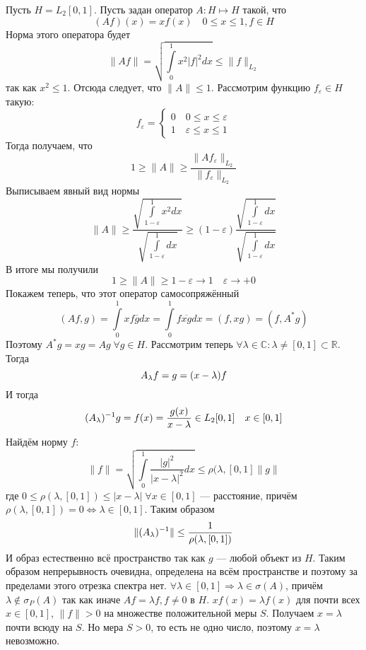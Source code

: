 \documentclass[14pt]{extarticle}
\begin{document}
\nopagebreak
\begin{Prim}
    Пусть $H = L_2[0,1]$.
    Пусть задан оператор $A : H \mapsto H$ такой, что
    $$
    (A f)(x) = x f(x) \quad 0 \le x \le 1, f \in H
    $$
    Норма этого оператора будет
    $$
    \|Af\| = \sqrt{\int\limits_0^1 x^2 |f|^2 dx} \le \|f\|_{L_2}
    $$
    так как $x^2 \le 1$.
    Отсюда следует, что $\|A\| \le 1$.
    Рассмотрим функцию $f_\varepsilon \in H$ такую:
    $$
    f_\varepsilon =
    \left\{
        \begin{aligned}
            0 \quad 0 \le x \le \varepsilon\\
            1 \quad \varepsilon \le x \le 1
        \end{aligned}
    \right.
    $$
    Тогда получаем, что
    $$
    1 \ge \|A\| \ge \dfrac{\|A f_\varepsilon\|_{L_2}}{\|f_\varepsilon\|
    _{L_2}}
    $$
    Выписываем явный вид нормы
    $$
    \|A\| \ge \dfrac{\sqrt{\int\limits_{1 - \varepsilon}^1 x^2 dx}}{\sqrt{\int
    \limits_{1-\varepsilon}^1 dx}} \ge (1  - \varepsilon)
    \dfrac{\sqrt{\int\limits_{1 - \varepsilon}^1 dx}}{\sqrt{\int\limits_{1 - 
    \varepsilon}^1 dx}}
    $$
    В итоге мы получили
    $$
    1 \ge \|A\| \ge 1 - \varepsilon \to 1 \quad \varepsilon \to +0
    $$
    Покажем теперь, что этот оператор самосопряжённый
    $$
    (Af, g) = \int\limits_0^1 x f \overline{g} dx = \int \limits_0^1 f 
    \overline{xg} dx = (f, xg) = (f, A^*g)
    $$
    Поэтому $A^*g = xg =Ag\; \forall g \in H$.
    Рассмотрим теперь $\forall \lambda \in \mathbb C\colon \lambda \ne [0,1] 
    \subset \mathbb R$.
    Тогда
    $$
    \Al f = g = (x - \lambda)f
    $$
    И тогда
    $$
    (A_\lambda)^{-1} g = f(x) = \dfrac{g(x)}{x -\lambda} \in L_2[0,1] \quad x \in [0,1]
    $$
    Найдём норму $f$:
    $$
    \|f\| = \sqrt{\int \limits_0^1 \dfrac{|g|^2}{|x - \lambda|^2}dx} \le 
    \rho(\lambda, [0,1] \|g\|
    $$
    где $0 \le \rho(\lambda, [0, 1]) \le |x - \lambda|\; \forall x \in [0, 1]$ 
    --- расстояние, причём $\rho(\lambda, [0, 1]) = 0 
    \Leftrightarrow \lambda \in [0,1]$.
    Таким образом 
    $$
    \|(A_\lambda)^{-1}\| \le \dfrac{1}{\rho(\lambda, [0, 1])}
    $$
    И образ естественно всё пространство так как $g$ --- любой объект из $H$.
    Таким образом непрерывность очевидна, определена на всём пространстве и 
    поэтому за пределами этого отрезка спектра
    нет.
    $\forall \lambda \in [0,1] \Rightarrow \lambda \in \sigma(A)$, причём $
    \lambda \notin \sigma_P(A)$ так как иначе
    $Af = \lambda f, f \ne 0$ в $H$.
    $x f(x) = \lambda f(x)$ для почти всех $x \in [0,1]$, $\|f\| > 0$ на 
    множестве положительной меры $S$. 
    Получаем $x = \lambda$ почти всюду на $S$.
    Но мера $S > 0$, то есть не одно число, поэтому $x = \lambda$ невозможно.
    

\end{Prim}
\end{document}
